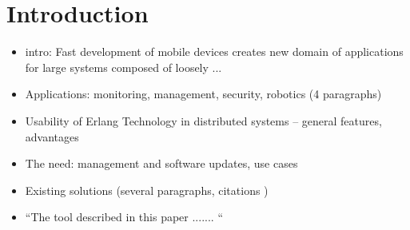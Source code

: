 \section{Introduction}

\begin{itemize}
	\item intro: Fast development of mobile devices creates new domain of applications for large systems composed of loosely ...
	\item Applications: monitoring, management, security, robotics (4 paragraphs)
	\item Usability of Erlang Technology in distributed systems -- general features, advantages
	\item The need: management and software updates, use cases 
	\item Existing solutions (several paragraphs, citations \cite{asoc}) 
	\item ``The tool described in this paper ....... ``
\end{itemize}

